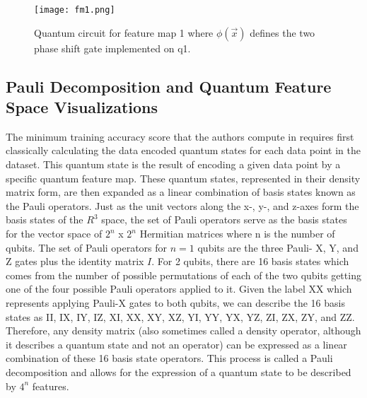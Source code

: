 \documentclass[
	a4paper, %
	10pt, %
	unnumberedsections, %
	twoside, %
]{LTJournalArticle}
\begin{document}
\begin{figure}
	\texttt{[image: fm1.png]}
	\caption{Quantum circuit for feature map 1 where $\phi(\vec{x})$ defines the two phase shift gate implemented on q1.}
	\label{fig:fm1}
\end{figure}

\subsection{Pauli Decomposition and Quantum Feature Space Visualizations}
The minimum training accuracy score that the authors compute in \autocite{suzuki2020analysis} requires first classically calculating the data encoded quantum states for each data point in the 
dataset. This quantum state is the result of encoding a given data point by a specific quantum feature map. These quantum states, represented in their density matrix form, are then expanded as 
a linear combination of basis states known as the Pauli operators. Just as the unit vectors along the x-, y-, and z-axes form the basis states of the $R^3$ space, the set of Pauli operators 
serve as the basis states for the vector space of $2^n$ x $2^n$ Hermitian matrices where n is the number of qubits. The set of Pauli operators for $n=1$ qubits are the three Pauli- X, Y, and 
Z gates plus the identity matrix $I$. For 2 qubits, there are 16 basis states which comes from the number of possible permutations of each of the two qubits getting one of the four possible 
Pauli operators applied to it. Given the label XX which represents applying Pauli-X gates to both qubits, we can describe the 16 basis states as II, IX, IY, IZ, XI, XX, XY, XZ, YI, YY, YX, YZ, 
ZI, ZX, ZY, and ZZ. Therefore, any density matrix (also sometimes called a density operator, although it describes a quantum state and not an operator) can be expressed as a linear combination 
of these 16 basis state operators. This process is called a Pauli decomposition and allows for the expression of a quantum state to be described by $4^n$ features.
\end{document}
